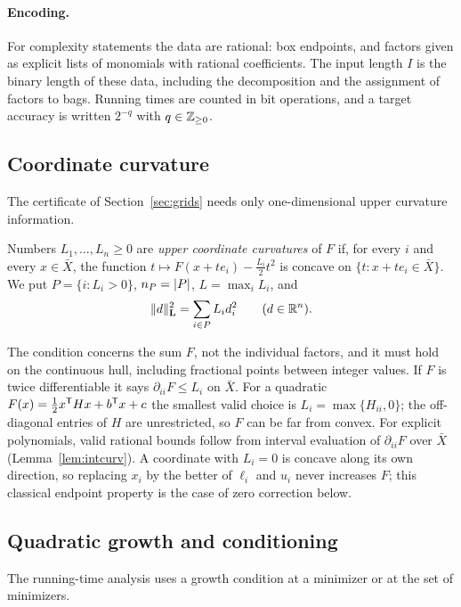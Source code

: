 \paragraph{Encoding.}
For complexity statements the data are rational: box endpoints, and factors
given as explicit lists of monomials with rational coefficients. The input
length $I$ is the binary length of these data, including the decomposition
and the assignment of factors to bags. Running times are counted in bit
operations, and a target accuracy is written $2^{-q}$ with $q\in\mathbb Z_{\ge0}$.

\subsection{Coordinate curvature}
The certificate of Section~\ref{sec:grids} needs only one-dimensional upper
curvature information.

\begin{definition}\label{def:curvature}
Numbers $L_1,\dots,L_n\ge0$ are \emph{upper coordinate curvatures} of $F$ if,
for every $i$ and every $x\in\bar X$, the function
$t\mapsto F(x+te_i)-\frac{L_i}{2}t^2$ is concave on
$\{t:x+te_i\in\bar X\}$. We put $P=\{i:L_i>0\}$, $n_P=\lvert P\rvert$, $L=\max_iL_i$,
and
\[
\lVert d\rVert_{\mathbf L}^2=\sum_{i\in P}L_id_i^2\qquad(d\in\mathbb R^n).
\]
\end{definition}

The condition concerns the sum $F$, not the individual factors, and it must
hold on the continuous hull, including fractional points between integer
values. If $F$ is twice differentiable it says $\partial_{ii}F\le L_i$ on
$\bar X$. For a quadratic $F(x)=\frac12x^\mathsf T Hx+b^\mathsf T x+c$ the smallest valid
choice is $L_i=\max\{H_{ii},0\}$; the off-diagonal entries of $H$ are
unrestricted, so $F$ can be far from convex. For explicit polynomials, valid
rational bounds follow from interval evaluation of $\partial_{ii}F$ over $\bar X$
(Lemma~\ref{lem:intcurv}). A coordinate with $L_i=0$ is concave along its own
direction, so replacing $x_i$ by the better of $\ell_i$ and $u_i$ never
increases $F$; this classical endpoint property
\cite{Rosenberg1972,DelPiaKhajavirad2026} is the case of zero correction
below.

\subsection{Quadratic growth and conditioning}
The running-time analysis uses a growth condition at a minimizer or at the
set of minimizers.

